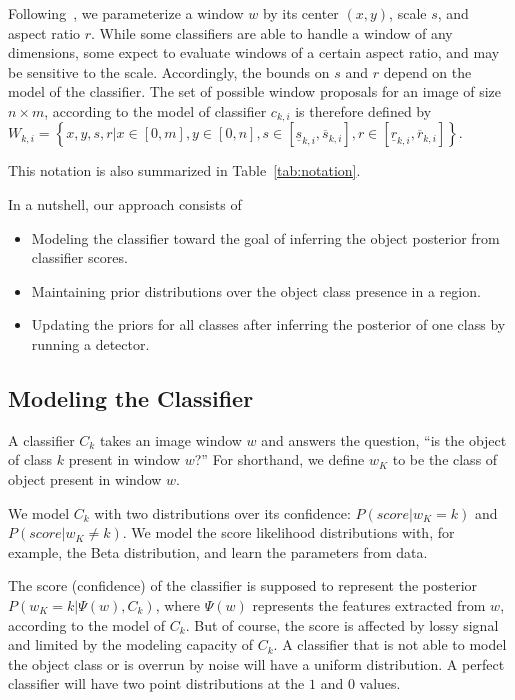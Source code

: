 Following~\cite{Lehmann2011}, we parameterize a window $w$ by its center $(x,y)$, scale $s$, and aspect ratio $r$.
While some classifiers are able to handle a window of any dimensions, some expect to evaluate windows of a certain aspect ratio, and may be sensitive to the scale.
Accordingly, the bounds on $s$ and $r$ depend on the model of the classifier.
The set of possible window proposals for an image of size $n \times m$, according to the model of classifier $c_{k,i}$ is therefore defined by $W_{k,i} = \left\{ x,y,s,r | x \in [0,m], y \in [0,n], s \in [\underline{s}_{k,i}, \overline{s}_{k,i}], r \in [\underline{r}_{k,i}, \overline{r}_{k,i}] \right\}$.

This notation is also summarized in Table~\ref{tab:notation}.

In a nutshell, our approach consists of
\begin{itemize}
\item Modeling the classifier toward the goal of inferring the object posterior from classifier scores.
\item Maintaining prior distributions over the object class presence in a region.
\item Updating the priors for all classes after inferring the posterior of one class by running a detector.
\end{itemize}

\subsection{Modeling the Classifier}
A classifier $C_k$ takes an image window $w$ and answers the question, ``is the object of class $k$ present in window $w$?''
For shorthand, we define $w_K$ to be the class of object present in window $w$.

We model $C_k$ with two distributions over its confidence: $P(score | w_K = k)$ and $P(score | w_K \neq k)$.
We model the score likelihood distributions with, for example, the Beta distribution, and learn the parameters from data.

The score (confidence) of the classifier is supposed to represent the posterior $P(w_K = k | \Psi(w), C_k)$, where $\Psi(w)$ represents the features extracted from $w$, according to the model of $C_k$.
But of course, the score is affected by lossy signal and limited by the modeling capacity of $C_k$.
A classifier that is not able to model the object class or is overrun by noise will have a uniform distribution.
A perfect classifier will have two point distributions at the $1$ and $0$ values.

